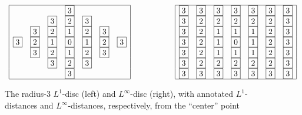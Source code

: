 \begin{figure}[hbt]
\[
\begin{array}{ccc}
\begin{array}{|ccccccc|}
\hline
  &   &   & \fbox{3} &   &   &   \\
  &   & \fbox{3} & \fbox{2} & \fbox{3} &   &   \\
  & \fbox{3} & \fbox{2} & \fbox{1} & \fbox{2} & \fbox{3} &   \\
\fbox{3} & \fbox{2} & \fbox{1} & \fbox{0} & \fbox{1} & \fbox{2} & \fbox{3} \\
  & \fbox{3} & \fbox{2} & \fbox{1} & \fbox{2} & \fbox{3} &   \\
  &   & \fbox{3} & \fbox{2} & \fbox{3} &   &   \\
  &   &   & \fbox{3} &   &   &   \\
\hline
\end{array}
  & \hspace*{.5in} &
\begin{array}{|ccccccc|}
\hline
\fbox{3} & \fbox{3} & \fbox{3} & \fbox{3} & \fbox{3} & \fbox{3} & \fbox{3} \\
\fbox{3} & \fbox{2} & \fbox{2} & \fbox{2} & \fbox{2} & \fbox{2} & \fbox{3} \\
\fbox{3} & \fbox{2} & \fbox{1} & \fbox{1} & \fbox{1} & \fbox{2} & \fbox{3} \\
\fbox{3} & \fbox{2} & \fbox{1} & \fbox{0} & \fbox{1} & \fbox{2} & \fbox{3} \\
\fbox{3} & \fbox{2} & \fbox{1} & \fbox{1} & \fbox{1} & \fbox{2} & \fbox{3} \\
\fbox{3} & \fbox{2} & \fbox{2} & \fbox{2} & \fbox{2} & \fbox{2} & \fbox{3} \\
\fbox{3} & \fbox{3} & \fbox{3} & \fbox{3} & \fbox{3} & \fbox{3} & \fbox{3} \\
\hline
\end{array}
\end{array}
\]
\caption{The radius-$3$ $L^1$-disc (left) and $L^\infty$-disc (right), with annotated $L^1$-distances and $L^\infty$-distances, respectively, from the ``center'' point}
\label{fig:Ln-discs}
\end{figure}

\medskip

 
 

